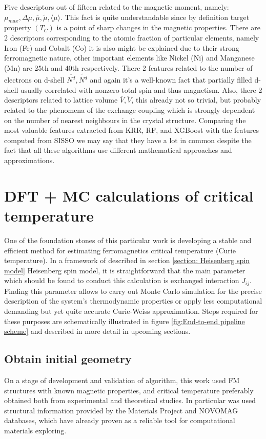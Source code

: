 Five descriptors out of fifteen related to the magnetic moment, namely: $\mu_{max}, \Delta \mu,  \overline{\mu}, \tilde{\mu}, \langle \mu \rangle$. This fact is quite understandable since by definition target property $(T_C)$ is a point of sharp changes in the magnetic properties.
There are 2 descriptors corresponding to the atomic fraction of particular elements, namely Iron (Fe) and Cobalt (Co) it is also might be explained due to their strong ferromagnetic nature, other important elements like Nickel (Ni) and Manganese (Mn) are 25th and 40th respectively.
There 2 features related to the number of electrons on d-shell $\overline{N^d}, \widetilde{N^d}$ and again it’s a well-known fact that partially filled d-shell usually correlated with nonzero total spin and thus magnetism.
Also, there 2 descriptors related to lattice volume $\overline{V}, \widetilde{V}$, this already not so trivial, but probably related to the phenomena of the exchange coupling which is strongly dependent on the number of nearest neighbours in the crystal structure.
Comparing the most valuable features extracted from KRR, RF, and XGBoost with the features computed from SISSO we may say that they have a lot in common despite the fact that all these algorithms use different mathematical approaches and approximations.




\cleardoublepage
\section{DFT + MC calculations of critical temperature}

\label{section: DFT_MC}

One of the foundation stones of this particular work is developing a stable and efficient method for estimating ferromagnetics critical temperature (Curie temperature). In a framework of described in section \ref{section: Heisenberg spin model} Heisenberg spin model, it is straightforward that the main parameter which should be found to conduct this calculation is exchanged interaction $J_{ij}$. Finding this parameter allows to carry out Monte Carlo simulation for the precise description of the system's thermodynamic properties or apply less computational demanding but yet quite accurate Curie-Weiss approximation.  Steps required for these purposes are schematically illustrated in figure \ref{fig:End-to-end pipeline scheme} and described in more detail in upcoming sections.


\subsection{Obtain initial geometry}
On a stage of development and validation of algorithm, this work used FM structures with known magnetic properties, and critical temperature preferably obtained both from experimental and theoretical studies. In particular was used structural information provided by the Materials Project and NOVOMAG databases, which have already proven as a reliable tool for computational materials exploring. 

